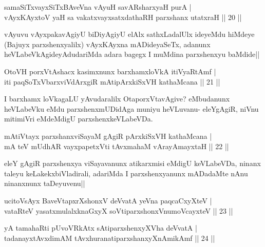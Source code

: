 
\begin{shl}
samaSiTxvayxSiTxBAveVna vAyuH savARsharxyaH purA |\\
vAyxKAyxtoV yaH sa vakatxvayxsatxdathaRH parxshanx utatxraH \hfill || 20 ||
\end{shl}

\begin{artha}
vAyuvu vAyxpakavAgiyU biDiyAgiyU elAlx sathxLadalUlx ideyeMdu hiMdeye (Bajuyx parxshenxyalilx) vAyxKAyxna mADideyaSeTx, adanunx heVLabeVkAgideyAdudariMda adara bagegx I muMdina parxshenxyu baMdide||
\end{artha}

\begin{shl}
OtoVH porxVtAshacx kasimxnunx barxhamxloVkA itiVyaRtAmf |\\
iti paqSoTxV\s barxviVdArxgiR mA\s tipArxkiSxVH kathaMcana \hfill || 21 ||
\end{shl}

\begin{artha}
I barxhamx loVkagaLU yAvudaralilx OtaporxVtavAgive? eMbudanunx heVLabeVku eMdu parxshenxmUDidAga muniyu heVLuvanu- eleYgAgiR, niVnu mitimiVri eMdeMdigU parxshenxkeVLabeVDa.
\end{artha}


\begin{shl}
mA\s tiVtayx parxshanxviSayaM gAgiR pArxkiSxVH kathaMcana |\\
mA teV mUdhAR vayxpapetxVti tAvxmahaM vArayAmayxtaH \hfill || 22 ||
\end{shl}

\begin{artha}
eleY gAgiR parxshenxya viSayavanunx atikarxmisi eMdigU keVLabeVDa, ninanx taleyu keLakekxbiVladirali, adariMda I parxshenxyanunx mADadaMte nAnu ninanxnunx taDeyuvenu||
\end{artha}


\begin{shl}
ucitoV\s sAyx BaveVtapxrXshonxV deVvatA yeVna paqcaCxyXteV |\\
vataRteV yasatxmulalxknaGxyX soV\s tiparxshonxV\s numoVcayxteV \hfill || 23 ||
\end{shl}

\begin{shl}
yA tamahaRti pUvoVRkAtx sA\s tiparxshenxyXVha deVvatA |\\
tadanayxtAvxdimAM tAvxhuranatiparxshanxyXnAmikAmf \hfill || 24 ||
\end{shl}


